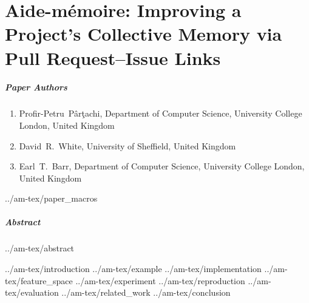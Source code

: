 \chapter{Aide-mémoire: Improving a Project’s Collective Memory via Pull Request--Issue Links}
\label{chapter:am}

\paragraph{Paper Authors}%
\begin{enumerate}
    \item[]  Profir-Petru~P\^ar\c{t}achi, Department of Computer Science, University College London, United Kingdom
    \item[] David~R.~White, University of Sheffield, United Kingdom
    \item[] Earl~T.~Barr, Department of Computer Science, University College London, United Kingdom
\end{enumerate}

{../am-tex/paper_macros}

\paragraph{Abstract}
{../am-tex/abstract}

{../am-tex/introduction}
{../am-tex/example}
{../am-tex/implementation}
{../am-tex/feature_space}
{../am-tex/experiment}
{../am-tex/reproduction}
{../am-tex/evaluation}
{../am-tex/related_work}
{../am-tex/conclusion}
